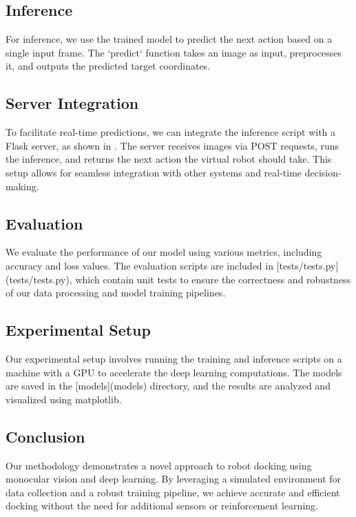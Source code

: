 \subsection{Inference}
For inference, we use the trained model to predict the next action based on a single input frame. The `predict` function takes an image as input, preprocesses it, and outputs the predicted target coordinates.

\subsection{Server Integration}
To facilitate real-time predictions, we can integrate the inference script with a Flask server, as shown in . The server receives images via POST requests, runs the inference, and returns the next action the virtual robot should take. This setup allows for seamless integration with other systems and real-time decision-making.

\subsection{Evaluation}
We evaluate the performance of our model using various metrics, including accuracy and loss values. The evaluation scripts are included in [tests/tests.py](tests/tests.py), which contain unit tests to ensure the correctness and robustness of our data processing and model training pipelines.

\subsection{Experimental Setup}
Our experimental setup involves running the training and inference scripts on a machine with a GPU to accelerate the deep learning computations. The models are saved in the [models](models) directory, and the results are analyzed and visualized using matplotlib.

\subsection{Conclusion}
Our methodology demonstrates a novel approach to robot docking using monocular vision and deep learning. By leveraging a simulated environment for data collection and a robust training pipeline, we achieve accurate and efficient docking without the need for additional sensors or reinforcement learning.
